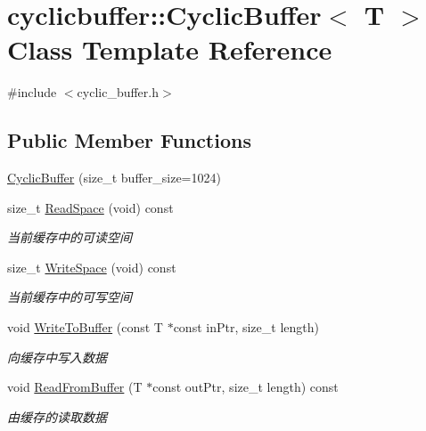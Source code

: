 \hypertarget{classcyclicbuffer_1_1CyclicBuffer}{\section{cyclicbuffer\-:\-:\-Cyclic\-Buffer$<$ \-T $>$ \-Class \-Template \-Reference}
\label{classcyclicbuffer_1_1CyclicBuffer}
}


{\ttfamily \#include $<$cyclic\-\_\-buffer.\-h$>$}

\subsection*{\-Public \-Member \-Functions}
\begin{DoxyCompactItemize}
\item 
\hyperlink{classcyclicbuffer_1_1CyclicBuffer_a53e229b6d7ebc4e41ba8446200e796df}{\-Cyclic\-Buffer} (size\-\_\-t buffer\-\_\-size=1024)
\item 
size\-\_\-t \hyperlink{classcyclicbuffer_1_1CyclicBuffer_a52275fdd9d4f5ab8f8d761d5f38e7c36}{\-Read\-Space} (void) const 
\begin{DoxyCompactList}\small\item\em 当前缓存中的可读空间 \end{DoxyCompactList}\item 
size\-\_\-t \hyperlink{classcyclicbuffer_1_1CyclicBuffer_a4c087db19f0aebf06ef990164bfe65d8}{\-Write\-Space} (void) const 
\begin{DoxyCompactList}\small\item\em 当前缓存中的可写空间 \end{DoxyCompactList}\item 
void \hyperlink{classcyclicbuffer_1_1CyclicBuffer_a4a8bcdf0e862f75182bcc8434fed32c3}{\-Write\-To\-Buffer} (const \-T $\ast$const in\-Ptr, size\-\_\-t length)
\begin{DoxyCompactList}\small\item\em 向缓存中写入数据 \end{DoxyCompactList}\item 
void \hyperlink{classcyclicbuffer_1_1CyclicBuffer_a2150d401e03dfe8dd6818e4af592e624}{\-Read\-From\-Buffer} (\-T $\ast$const out\-Ptr, size\-\_\-t length) const 
\begin{DoxyCompactList}\small\item\em 由缓存的读取数据 \end{DoxyCompactList}\item 

\end{DoxyCompactItemize}

